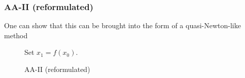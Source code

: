 %

\begin{frame}
	\frametitle{AA-II (reformulated)}
	One can show that this can be brought into the form of a quasi-Newton-like method
	\begin{figure}
	\begin{algorithm}[H]
	\caption{AA-II (reformulated)}
	\color{gray}
	\BlankLine
	{\black Set $x_1 =f(x_0)$.}
	
	\end{algorithm}
	\end{figure}
\end{frame}


